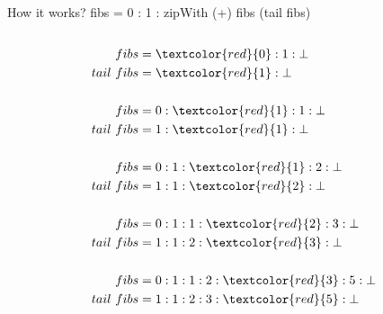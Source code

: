 \documentclass[handout]{beamer}
\begin{document}
\begin{frame}[fragile]{How it works? fibs = 0 : 1 : zipWith (+) fibs (tail fibs)}

\begin{columns}[T]
  \begin{column}{.7\textwidth}

\vspace{-3.5ex}

\begin{align*}
fibs       &= \textcolor{red}{0} : 1 : {\perp} \\
tail\ fibs &= \textcolor{red}{1} : {\perp} \\
\\
fibs       &= 0 : \textcolor{red}{1} : 1 : {\perp} \\
tail\ fibs &= 1 : \textcolor{red}{1} : {\perp} \\
\\
fibs       &= 0 : 1 : \textcolor{red}{1} : 2 : {\perp} \\
tail\ fibs &= 1 : 1 : \textcolor{red}{2} : {\perp} \\
\\
fibs       &= 0 : 1 : 1 : \textcolor{red}{2} : 3 : {\perp} \\
tail\ fibs &= 1 : 1 : 2 : \textcolor{red}{3} : {\perp} \\
\\
fibs       &= 0 : 1 : 1 : 2 : \textcolor{red}{3} : 5 : {\perp} \\
tail\ fibs &= 1 : 1 : 2 : 3 : \textcolor{red}{5} : {\perp} \\
\end{align*}

\end{column}


\end{columns}
\end{frame}
\end{document}
